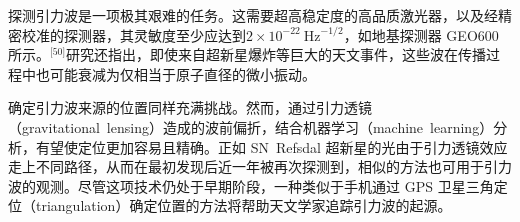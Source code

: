 探测引力波是一项极其艰难的任务。这需要超高稳定度的高品质激光器，以及经精密校准的探测器，其灵敏度至少应达到$2\!\times\!10^{-22}\ \mathrm{Hz}^{-1/2}$，如地基探测器 GEO600 所示。\(^\text{[50]}\)研究还指出，即使来自超新星爆炸等巨大的天文事件，这些波在传播过程中也可能衰减为仅相当于原子直径的微小振动。\cite{ref55}

确定引力波来源的位置同样充满挑战。然而，通过引力透镜（gravitational~lensing）造成的波前偏折，结合机器学习（machine~learning）分析，有望使定位更加容易且精确。\cite{ref56}正如 SN~Refsdal 超新星的光由于引力透镜效应走上不同路径，从而在最初发现后近一年被再次探测到，相似的方法也可用于引力波的观测。\cite{ref57}尽管这项技术仍处于早期阶段，一种类似于手机通过 GPS 卫星三角定位（triangulation）确定位置的方法将帮助天文学家追踪引力波的起源。\cite{ref58}
